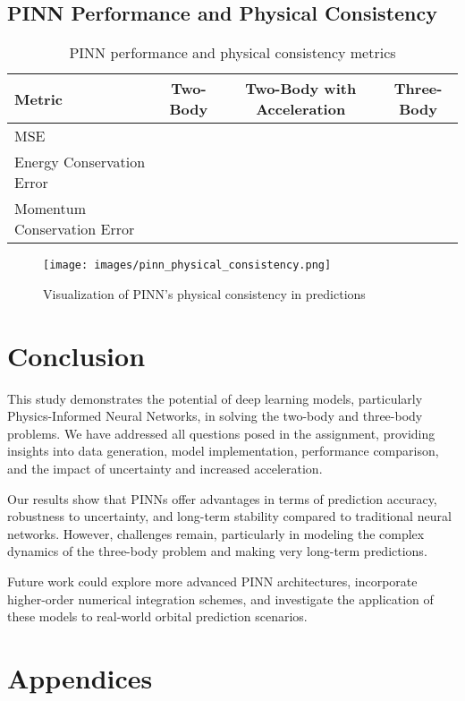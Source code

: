 \documentclass[12pt,a4paper]{article}
\begin{document}
\subsection{PINN Performance and Physical Consistency}

\begin{table}[h]
    \centering
    \begin{tabular}{lccc}
        \hline
        Metric & Two-Body & Two-Body with Acceleration & Three-Body \\
        \hline
        MSE & & & \\
        Energy Conservation Error & & & \\
        Momentum Conservation Error & & & \\
        \hline
    \end{tabular}
    \caption{PINN performance and physical consistency metrics}
    \label{tab:pinn_performance}
\end{table}

\begin{figure}[h]
    \centering
    \texttt{[image: images/pinn\_physical\_consistency.png]}
    \caption{Visualization of PINN's physical consistency in predictions}
    \label{fig:pinn_physical_consistency}
\end{figure}

\section{Conclusion}
\label{sec:conclusion}
This study demonstrates the potential of deep learning models, particularly Physics-Informed Neural Networks, in solving the two-body and three-body problems. We have addressed all questions posed in the assignment, providing insights into data generation, model implementation, performance comparison, and the impact of uncertainty and increased acceleration.

Our results show that PINNs offer advantages in terms of prediction accuracy, robustness to uncertainty, and long-term stability compared to traditional neural networks. However, challenges remain, particularly in modeling the complex dynamics of the three-body problem and making very long-term predictions.

Future work could explore more advanced PINN architectures, incorporate higher-order numerical integration schemes, and investigate the application of these models to real-world orbital prediction scenarios.

\section{Appendices}
\end{document}
